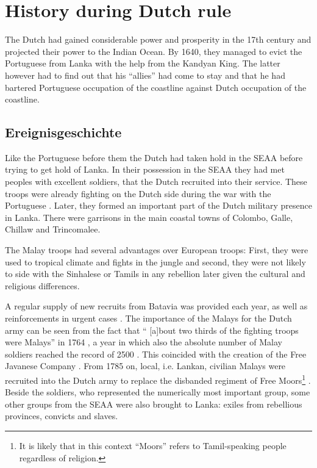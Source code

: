 \section{History during Dutch rule}\label{sec:slmbg:HistoryduringDutchrule}
The Dutch had gained considerable power and prosperity in the 17th century \kuckn and projected their power to the Indian Ocean. By 1640, they managed to evict the Portuguese from Lanka with the help from the Kandyan King. \kuckn The latter however had to find out that his ``allies'' had come to stay and that he had bartered Portuguese occupation of the coastline  against Dutch occupation of the coastline.

\subsection{Ereignisgeschichte}\label{sec:slmbg:Dutch:Ereignisgeschichte}
Like the Portuguese before them \kuckn the Dutch had taken hold in the SEAA before trying to get hold of Lanka. In their possession in the SEAA they had met peoples with excellent soldiers, that the Dutch recruited into their service. These troops were already fighting on the Dutch side during the war with the Portuguese  \citep[44]{Hussainmiya1990}.
Later, they formed an important part of the Dutch military presence in Lanka. There were garrisons in the main coastal towns of Colombo, Galle, Chillaw and Trincomalee.

The Malay troops had several advantages over European troops: First, they were used to tropical climate and fights in the jungle and  second, they were not likely to side with the Sinhalese or Tamils in any rebellion later given the cultural and religious differences.

 A regular supply of new recruits from Batavia was provided each year, as well as reinforcements in urgent cases \citep[48]{Hussainmiya1987}. The importance of the Malays for the Dutch army can be seen from the fact that `` [a]bout two thirds of the fighting troops were Malays'' in 1764 \citep[37]{Powell1973}, a year in which also the absolute number of Malay soldiers reached the record of 2500 \citep[49]{Hussainmiya1990}. This coincided with the creation of the Free Javanese Company \citep[52]{Hussainmiya1990}. From 1785 on, local, i.e. Lankan, civilian Malays were recruited into the Dutch army to replace the disbanded regiment of Free Moors\footnote{It is likely that in this context ``Moors'' refers to Tamil-speaking people regardless of religion.} \citep[54]{Hussainmiya1987}.
  Beside the soldiers, who represented the numerically  most important group, some other groups   from the SEAA were also brought to Lanka: exiles from rebellious provinces, convicts and slaves.

